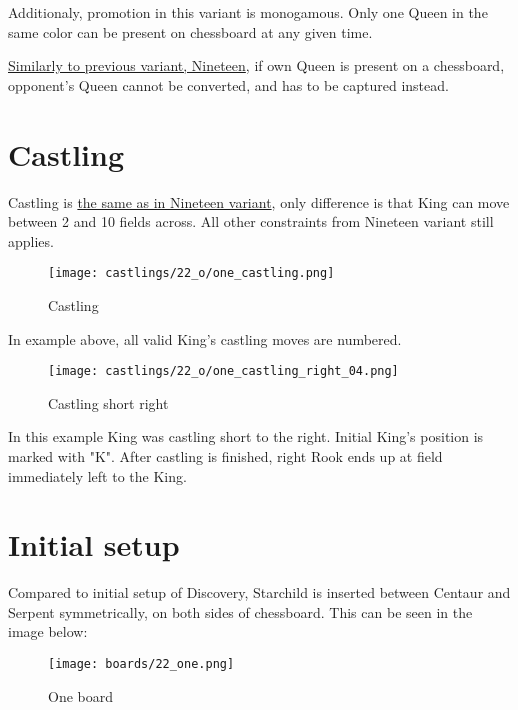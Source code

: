 Additionaly, promotion in this variant is monogamous. Only one Queen
in the same color can be present on chessboard at any given time.

\hyperref[fig:scn_n_20_only_one_queen]{Similarly to previous variant, Nineteen},
if own Queen is present on a chessboard, opponent's Queen cannot be
converted, and has to be captured instead.

\clearpage %

\section*{Castling}
\label{sec:One/Castling}

Castling is
\hyperref[sec:Nineteen/Castling]{the same as in Nineteen variant},
only difference is that King can move
between 2 and 10 fields across. All other constraints from Nineteen variant still
applies.

\noindent
\begin{figure}[!h]
\texttt{[image: castlings/22\_o/one\_castling.png]}
\caption{Castling}
\label{fig:one_castling}
\end{figure}

In example above, all valid King's castling moves are numbered.

\noindent
\begin{figure}[!h]
\texttt{[image: castlings/22\_o/one\_castling\_right\_04.png]}
\caption{Castling short right}
\label{fig:one_castling_right_04}
\end{figure}

In this example King was castling short to the right. Initial King's position is
marked with "K". After castling is finished, right Rook ends up at field immediately
left to the King.

\clearpage %

\section*{Initial setup}
\label{sec:One/Initial setup}

Compared to initial setup of Discovery, Starchild is inserted between Centaur and
Serpent symmetrically, on both sides of chessboard. This can be seen in the image
below:

\noindent
\begin{figure}[h]
\texttt{[image: boards/22\_one.png]}
\caption{One board}
\label{fig:22_one}
\end{figure}

\clearpage %
